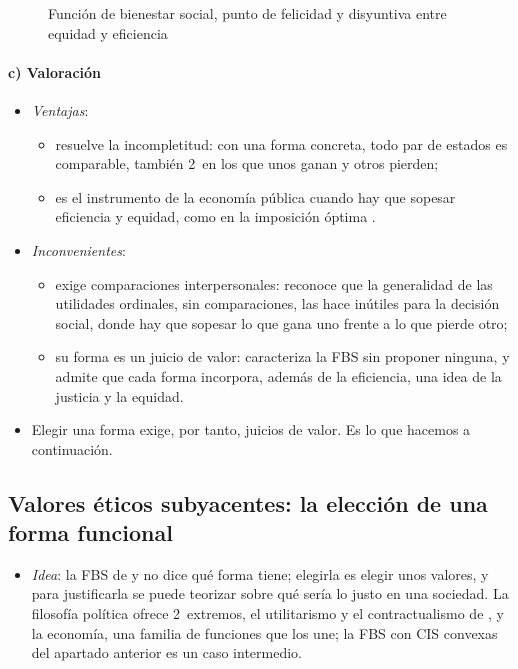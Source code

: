 \documentclass[11pt]{article}
\begin{document}
\begin{figure}[H]
\centering
\caption{Función de bienestar social, punto de felicidad y disyuntiva entre equidad y eficiencia}\label{fig:fbs-gfpu-tradeoff}
\end{figure}

\paragraph{c) Valoración}

\begin{itemize}
\item \emph{Ventajas}:
  \begin{itemize}
  \item resuelve la incompletitud: con una forma concreta, todo par de estados es comparable, también 2~en los que unos ganan y otros pierden;
  \item es el instrumento de la economía pública cuando hay que sopesar eficiencia y equidad, como en la imposición óptima .
  \end{itemize}
\item \emph{Inconvenientes}:
  \begin{itemize}
  \item exige comparaciones interpersonales:  reconoce que la generalidad de las utilidades ordinales, sin comparaciones, las hace inútiles para la decisión social, donde hay que sopesar lo que gana uno frente a lo que pierde otro;
  \item su forma es un juicio de valor:  caracteriza la FBS sin proponer ninguna, y admite que cada forma incorpora, además de la eficiencia, una idea de la justicia y la equidad.
  \end{itemize}
\item Elegir una forma exige, por tanto, juicios de valor. Es lo que hacemos a continuación.
\end{itemize}

\subsection{Valores éticos subyacentes: la elección de una forma funcional}\label{sec:valores-eticos}

\begin{itemize}
\item \emph{Idea}: la FBS de  y  no dice qué forma tiene; elegirla es elegir unos valores, y para justificarla se puede teorizar sobre qué sería lo justo en una sociedad. La filosofía política ofrece 2~extremos, el utilitarismo y el contractualismo de , y la economía, una familia de funciones que los une; la FBS con CIS convexas del apartado anterior es un caso intermedio.
\end{itemize}
\end{document}
